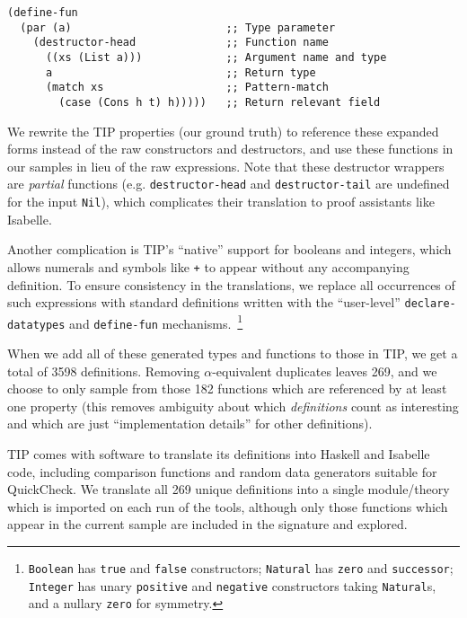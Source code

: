 \begin{samepage}
\begin{verbatim}
(define-fun
  (par (a)                        ;; Type parameter
    (destructor-head              ;; Function name
      ((xs (List a)))             ;; Argument name and type
      a                           ;; Return type
      (match xs                   ;; Pattern-match
        (case (Cons h t) h)))))   ;; Return relevant field
\end{verbatim}
\end{samepage}

\begin{sloppypar}
  We rewrite the TIP properties (our ground truth) to reference these expanded
  forms instead of the raw constructors and destructors, and use these functions
  in our samples in lieu of the raw expressions. Note that these destructor
  wrappers are \emph{partial} functions (e.g. \texttt{destructor-head} and
  \texttt{destructor-tail} are undefined for the input \texttt{Nil}), which
  complicates their translation to proof assistants like Isabelle.
\end{sloppypar}

Another complication is TIP's ``native'' support for booleans and integers,
which allows numerals and symbols like \texttt{+} to appear without any
accompanying definition. To ensure consistency in the translations, we replace
all occurrences of such expressions with standard definitions written with the
``user-level'' \texttt{declare-datatypes} and \texttt{define-fun}
mechanisms.~\footnote{\texttt{Boolean} has \texttt{true} and \texttt{false}
  constructors; \texttt{Natural} has \texttt{zero} and \texttt{successor};
  \texttt{Integer} has unary \texttt{positive} and \texttt{negative}
  constructors taking \texttt{Natural}s, and a nullary \texttt{zero} for
  symmetry.}

When we add all of these generated types and functions to those in TIP, we get a
total of 3598 definitions. Removing $\alpha$-equivalent duplicates leaves 269,
and we choose to only sample from those 182 functions which are referenced by at
least one property (this removes ambiguity about which \emph{definitions} count
as interesting and which are just ``implementation details'' for other
definitions).

TIP comes with software to translate its definitions into Haskell and Isabelle
code, including comparison functions and random data generators suitable for
QuickCheck. We translate all 269 unique definitions into a single module/theory
which is imported on each run of the tools, although only those functions which
appear in the current sample are included in the signature and explored.

